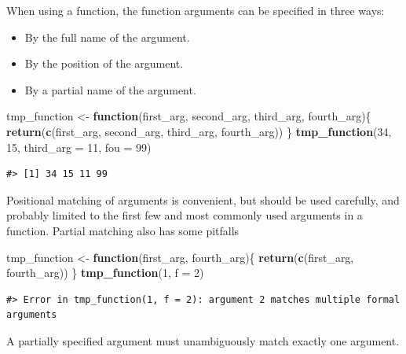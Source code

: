 \documentclass[
  11pt,
]{krantz}
\newenvironment{Shaded}{\begin{snugshade}}{\end{snugshade}}
\newcommand{\ControlFlowTok}[1]{\textcolor[rgb]{0.13,0.29,0.53}{\textbf{#1}}}
\newcommand{\DataTypeTok}[1]{\textcolor[rgb]{0.13,0.29,0.53}{#1}}
\newcommand{\DecValTok}[1]{\textcolor[rgb]{0.00,0.00,0.81}{#1}}
\newcommand{\KeywordTok}[1]{\textcolor[rgb]{0.13,0.29,0.53}{\textbf{#1}}}
\newcommand{\NormalTok}[1]{#1}
\newcommand{\StringTok}[1]{\textcolor[rgb]{0.31,0.60,0.02}{#1}}
\providecommand{\tightlist}{%
  \setlength{\itemsep}{0pt}\setlength{\parskip}{0pt}}
\theoremstyle{definition}
\theoremstyle{definition}
\theoremstyle{definition}
\theoremstyle{definition}
\theoremstyle{remark}
\begin{document}
When using a function, the function arguments can be specified in three ways:

\begin{itemize}
\tightlist
\item
  By the full name of the argument.
\item
  By the position of the argument.
\item
  By a partial name of the argument.
\end{itemize}

\begin{Shaded}
\begin{Highlighting}[]
\NormalTok{tmp\_function \textless{}{-}}\StringTok{ }\ControlFlowTok{function}\NormalTok{(first\_arg, second\_arg, third\_arg, fourth\_arg)\{}
  \KeywordTok{return}\NormalTok{(}\KeywordTok{c}\NormalTok{(first\_arg, second\_arg, third\_arg, fourth\_arg))}
\NormalTok{\}}
\KeywordTok{tmp\_function}\NormalTok{(}\DecValTok{34}\NormalTok{, }\DecValTok{15}\NormalTok{, }\DataTypeTok{third\_arg =} \DecValTok{11}\NormalTok{, }\DataTypeTok{fou =} \DecValTok{99}\NormalTok{)}
\end{Highlighting}
\end{Shaded}

\begin{verbatim}
#> [1] 34 15 11 99
\end{verbatim}

Positional matching of arguments is convenient, but should be used carefully, and probably limited to the first few and most commonly used arguments in a function. Partial matching also has some pitfalls

\begin{Shaded}
\begin{Highlighting}[]
\NormalTok{tmp\_function \textless{}{-}}\StringTok{ }\ControlFlowTok{function}\NormalTok{(first\_arg, fourth\_arg)\{}
\KeywordTok{return}\NormalTok{(}\KeywordTok{c}\NormalTok{(first\_arg, fourth\_arg))}
\NormalTok{\}}
\KeywordTok{tmp\_function}\NormalTok{(}\DecValTok{1}\NormalTok{, }\DataTypeTok{f =} \DecValTok{2}\NormalTok{)}
\end{Highlighting}
\end{Shaded}

\begin{verbatim}
#> Error in tmp_function(1, f = 2): argument 2 matches multiple formal arguments
\end{verbatim}

A partially specified argument must unambiguously match exactly one argument.
\end{document}
